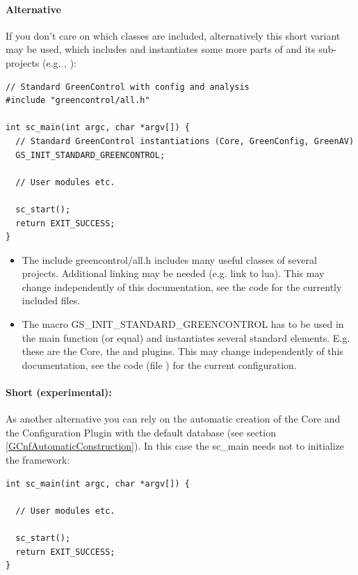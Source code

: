 \noindent
\begin{minipage}{\textwidth}
\paragraph{Alternative} If you don't care on which classes are included, alternatively this short variant may be used, which includes and instantiates some more parts of \GreenControl and its sub-projects (e.g. \GreenConfig, \GreenAV):
\begin{lstlisting}
// Standard GreenControl with config and analysis
#include "greencontrol/all.h"

int sc_main(int argc, char *argv[]) {
  // Standard GreenControl instantiations (Core, GreenConfig, GreenAV)
  GS_INIT_STANDARD_GREENCONTROL;

  // User modules etc.

  sc_start();
  return EXIT_SUCCESS;
}
\end{lstlisting}
\end{minipage}


\begin{itemize}
  \item The include {\sffamily greencontrol/all.h} includes many useful classes of several projects. Additional linking may be needed (e.g. link to lua). This may change independently of this documentation, see the code for the currently included files.
  \item The macro {\sffamily GS\_INIT\_STANDARD\_GREENCONTROL} has to be used in the main function (or equal) and instantiates several standard elements. E.g. these are the Core, the \GreenConfig and \GreenAV plugins. This may change independently of this documentation, see the code (file ) for the current configuration.
\end{itemize}

\noindent
\begin{minipage}{\textwidth}
\paragraph{Short (experimental):} As another alternative you can rely on the automatic creation of the \GreenControl Core and the Configuration Plugin with the default database (see section \ref{GCnfAutomaticConstruction}). In this case the {\sffamily sc\_main} needs not to initialize the framework:
\begin{lstlisting}
int sc_main(int argc, char *argv[]) {

  // User modules etc.

  sc_start();
  return EXIT_SUCCESS;
}
\end{lstlisting}
\end{minipage}


